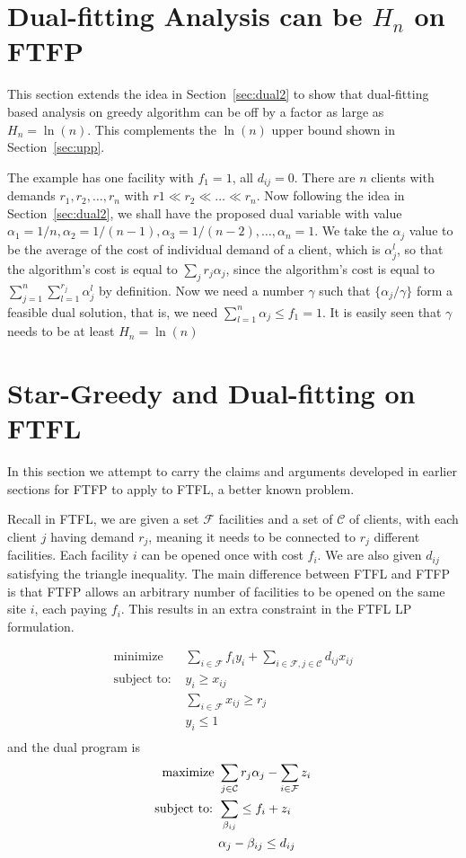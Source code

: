 \documentclass[11pt]{article}
\begin{document}
\section{Dual-fitting Analysis can be $H_n$ on FTFP}
This section extends the idea in Section~\ref{sec:dual2} to show that
dual-fitting based analysis on greedy algorithm can be off by a factor
as large as $H_n = \ln(n)$. This complements the $\ln(n)$ upper bound
shown in Section~\ref{sec:upp}.

The example has one facility with $f_1 = 1$, all $d_{ij}=0$. There are
$n$ clients with demands $r_1, r_2, \ldots, r_n$ with $r1 \ll r_2 \ll
\ldots \ll r_n$. Now following the idea in Section~\ref{sec:dual2}, we
shall have the proposed dual variable with value $\alpha_1=1/n,
\alpha_2 = 1/(n-1), \alpha_3 = 1/(n-2), \ldots, \alpha_n = 1$. We take
the $\alpha_j$ value to be the average of the cost of individual
demand of a client, which is $\alpha_j^l$, so that the algorithm's
cost is equal to $\sum_{j} r_j\alpha_j$, since the algorithm's cost is
equal to $\sum_{j=1}^n \sum_{l=1}^{r_j} \alpha_j^l$ by definition. Now
we need a number $\gamma$ such that $\{\alpha_j/\gamma\}$ form a
feasible dual solution, that is, we need $\sum_{l=1}^n \alpha_j \leq
f_1 = 1$. It is easily seen that $\gamma$ needs to be at least $H_n =
\ln(n)$

\section{Star-Greedy and Dual-fitting on FTFL}
In this section we attempt to carry the claims and arguments developed
in earlier sections for FTFP to apply to FTFL, a better known
problem.

Recall in FTFL, we are given a set $\mathcal F$ facilities and a set of
$\mathcal C$ of clients, with each client $j$ having demand $r_j$,
meaning it needs to be connected to $r_j$ different facilities. Each
facility $i$ can be opened once with cost $f_i$. We are also given
$d_{ij}$ satisfying the triangle inequality. The main difference
between FTFL and FTFP is that FTFP allows an arbitrary number of
facilities to be opened on the same site $i$, each paying $f_i$. This
results in an extra constraint in the FTFL LP formulation.

\begin{align*}
  \text{minimize }& \sum_{i\in\mathcal{F}} f_i y_i +
  \sum_{i\in\mathcal{F}, j\in\mathcal{C}} d_{ij} x_{ij}\\
  \text{subject to: }& y_i \geq x_{ij}\\
  &\sum_{i\in\mathcal{F}} x_{ij} \geq r_j\\
  &y_i \leq 1\\
\end{align*}
and the dual program is
\begin{align}
  \label{eq:ftfl_dual}
  \text{maximize }& \sum_{j\in\mathcal{C}} r_j \alpha_j -
  \sum_{i\in\mathcal{F}} z_i\\ \notag
  \text{subject to: }& \sum_{\beta_{ij}} \leq f_i + z_i\\ \notag
  & \alpha_j - \beta_{ij} \leq d_{ij}\\ \notag
\end{align}
\end{document}

